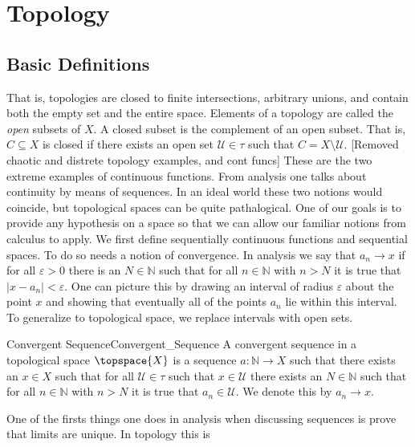 \section{Topology}
    \subsection{Basic Definitions}
        That is, topologies are closed to finite intersections, arbitrary
        unions, and contain both the empty set and the entire space.
        Elements of a topology are called the \textit{open} subsets of $X$.
        A closed subset is the complement of an open subset. That is,
        $C\subseteq{X}$ is closed if there exists an open set
        $\mathcal{U}\in\tau$ such that $C=X\setminus\mathcal{U}$.
        [Removed chaotic and distrete topology examples, and cont funcs]
        These are the two extreme examples of continuous functions. From
        analysis one talks about continuity by means of sequences. In an
        ideal world these two notions would coincide, but topological spaces
        can be quite pathalogical. One of our goals is to provide any
        hypothesis on a space so that we can allow our familiar notions from
        calculus to apply. We first define sequentially continuous functions
        and sequential spaces. To do so needs a notion of convergence. In
        analysis we say that $a_{n}\rightarrow{x}$ if for all
        $\varepsilon>0$ there is an $N\in\mathbb{N}$ such that for all
        $n\in\mathbb{N}$ with $n>N$ it is true that $|x-a_{n}|<\varepsilon$.
        One can picture this by drawing an interval of radius $\varepsilon$
        about the point $x$ and showing that eventually all of the points
        $a_{n}$ lie within this interval. To generalize to topological
        space, we replace intervals with open sets.
        \begin{fdefinition}{Convergent Sequence}{Convergent_Sequence}
            A convergent sequence in a topological space $\topspace{X}$ is a
            sequence $a:\mathbb{N}\rightarrow{X}$ such that there exists an
            $x\in{X}$ such that for all $\mathcal{U}\in\tau$ such that
            $x\in\mathcal{U}$ there exists an $N\in\mathbb{N}$ such that for
            all $n\in\mathbb{N}$ with $n>N$ it is true that
            $a_{n}\in\mathcal{U}$. We denote this by $a_{n}\rightarrow{x}$.
        \end{fdefinition}
        One of the firsts things one does in analysis when discussing
        sequences is prove that limits are unique. In topology this is
